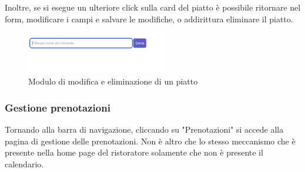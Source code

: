     Inoltre, se si esegue un ulteriore click sulla card del piatto è possibile ritornare nel form, modificare i campi e salvare le modifiche, o addirittura eliminare il piatto.
    
        \begin{figure}[htbp]
            \centering
            \includegraphics[width=0.5625\textwidth]{./img/Dettaglio.jpg}
            \caption{Modulo di modifica e eliminazione di un piatto}
        \end{figure}

    \subsubsection{Gestione prenotazioni}
    Tornando alla barra di navigazione, cliccando su "Prenotazioni" si accede alla pagina di gestione delle prenotazioni. Non è altro che lo stesso meccanismo che è presente nella home page del ristoratore solamente che non è presente il calendario.
